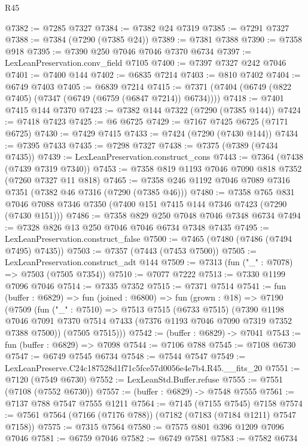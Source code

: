 \begin{lexlean}{R45}
\begin{coremodule}
{@7382 := @7285 @7327
@7384 := @7382 @24 @7319
@7385 := @7291 @7327
@7388 := @7384 (@7290 (@7385 @24))
@7389 := @7381 @7388
@7390 := @7358 @918
@7395 := @7390 @250 @7046 @7046 @7370 @6734
@7397 := LexLeanPreservation.conv_field @7105
@7400 := @7397 @7327 @242 @7046
@7401 := @7400 @144
@7402 := @6835 @7214
@7403 := @810 @7402
@7404 := @6749 @7403
@7405 := @6839 @7214
@7415 := @7371 (@7404 (@6749 (@822 @7405) (@7347 (@6749 (@6759 (@6847 @7214)) @6734))))
@7418 := @7401 @7415 @144 @7370
@7423 := @7382 @144 @7322 (@7290 (@7385 @144))
@7424 := @7418 @7423
@7425 := @6 @6725
@7429 := @7167 @7425 @6725 (@7171 @6725)
@7430 := @7429 @7415
@7433 := @7424 (@7290 (@7430 @144))
@7434 := @7395 @7433
@7435 := @7298 @7327
@7438 := @7375 (@7389 (@7434 @7435))
@7439 := LexLeanPreservation.construct_cons
@7443 := @7364 (@7438 (@7439 @7319 @7340))
@7453 := @7358 @819 @1193 @7046 @7090 @818 @7352 (@7260 @7327 @11 @818)
@7465 := @7358 @246 @1192 @7046 @7089 @7316 @7351 (@7382 @46 @7316 (@7290 (@7385 @46)))
@7480 := @7358
    @765
    @831
    @7046
    @7088
    @7346
    @7350
    (@7400 @151 @7415 @144 @7346 @7423 (@7290 (@7430 @151)))
@7486 := @7358 @829 @250 @7048 @7046 @7348 @6734
@7494 := @7328 @826 @13 @250 @7046 @7046 @6734 @7348 @7435
@7495 := LexLeanPreservation.construct_false
@7500 := @7465 (@7480 (@7486 (@7494 @7495) @7435))
@7503 := @7357 (@7443 (@7453 @7500))
@7505 := LexLeanPreservation.construct_adt @144
@7509 := @7313 (fun ("_" : @7078) => @7503 (@7505 @7354))
@7510 := @7077 @7222
@7513 := @7330 @1199 @7096 @7046
@7514 := @7335 @7352
@7515 := @7371 @7514
@7541 := fun (buffer : @6829) =>
  fun (joined : @6800) =>
  fun (grown : @18) =>
  @7190
    (@7509
      (fun ("_" : @7510) =>
      @7513
        @7515
        (@6733 @7515)
        (@7390
          @1198
          @7046
          @7091
          @7370
          @7514
          @7433
          (@7376 @1193 @7046 @7090 @7319 @7352 @7388 @7500))
        (@7505 @7515)))
@7542 := (buffer : @6829) -> @7041
@7543 := fun (buffer : @6829) => @7098
@7544 := @7106 @788
@7545 := @7108 @6730
@7547 := @6749 @7545 @6734
@7548 := @7544 @7547
@7549 := LexLeanPreserve.C24c187528d1f71c5fce57d0056e4e7b4.R45.__fits_20
@7551 := @7120 (@7549 @6730)
@7552 := LexLeanStd.Buffer.refuse
@7555 := @7551 (@7108 (@7552 @6730))
@7557 := (buffer : @6829) -> @7548 @7555
@7561 := @7137 @788 @7547 @7555 @1211
@7564 := @7145 (@7155 @7545) @7158
@7574 := @7561 @7564 (@7166 (@7176 @788)) (@7182 (@7183 (@7184 @1211) @7547 @7158))
@7575 := @7315 @7564
@7580 := @7575 @801 @396 @1209 @7096 @7046
@7581 := @6759 @7046
@7582 := @6749 @7581
@7583 := @7582 @6734
}
\end{coremodule}
\end{lexlean}
